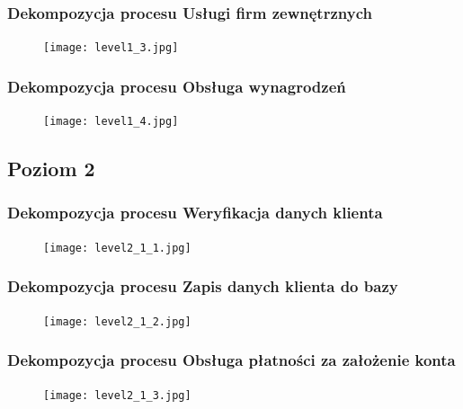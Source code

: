 \documentclass[a4paper,11pt]{article}
\begin{document}
\subsubsection{Dekompozycja procesu Usługi firm zewnętrznych}
    \begin{figure}[!htb]
    \centerline{\texttt{[image: level1\_3.jpg]}}
    \label{fig:level1_3}
    \end{figure}
    \newpage
  
\subsubsection{Dekompozycja procesu Obsługa wynagrodzeń}
    \begin{figure}[!htb]
    \centerline{\texttt{[image: level1\_4.jpg]}}
    \label{fig:level1_4}
    \end{figure}
    \newpage  
    
    
    
\subsection{Poziom 2}
\subsubsection{Dekompozycja procesu Weryfikacja danych klienta}
    \begin{figure}[!htb]
    \centerline{\texttt{[image: level2\_1\_1.jpg]}}
    \label{fig:level2_1_1}
    \end{figure}
    \newpage
    
\subsubsection{Dekompozycja procesu Zapis danych klienta do bazy}
    \begin{figure}[!htb]
    \centerline{\texttt{[image: level2\_1\_2.jpg]}}
    \label{fig:level2_1_2}
    \end{figure}
    \newpage
    
\subsubsection{Dekompozycja procesu Obsługa płatności za założenie konta}
    \begin{figure}[!htb]
    \centerline{\texttt{[image: level2\_1\_3.jpg]}}
    \label{fig:level2_1_3}
    \end{figure}
    \newpage
    
\end{document}
